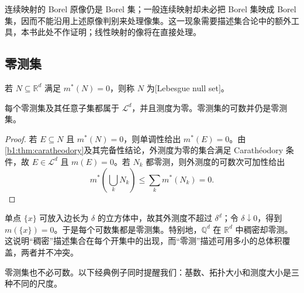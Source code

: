 连续映射的 Borel 原像仍是 Borel 集；一般连续映射却未必把 Borel 集映成 Borel 集，因而不能沿用上述原像判别来处理像集。这一现象需要描述集合论中的额外工具，本书此处不作证明；线性映射的像将在直接处理。

\subsection{零测集}
\label{b1:subsec:030203}

\begin{definition}
\label{b1:def:lebesgue-null}
若 \(N\subseteq\mathbb R^d\) 满足 \(m^*(N)=0\)，则称 \(N\) 为[Lebesgue null set]。
\end{definition}

\begin{proposition}
\label{b1:prop:null-subsets}
每个零测集及其任意子集都属于 \(\mathcal L^d\)，并且测度为零。零测集的可数并仍是零测集。
\end{proposition}
\begin{proof}
若 \(E\subseteq N\) 且 \(m^*(N)=0\)，则单调性给出 \(m^*(E)=0\)。由\cref{b1:thm:caratheodory}及其完备性结论，外测度为零的集合满足 Carathéodory 条件，故 \(E\in\mathcal L^d\) 且 \(m(E)=0\)。若 \(N_k\) 都零测，则外测度的可数次可加性给出
\[
m^*\left(\bigcup_kN_k\right)
\leq\sum_km^*(N_k)=0.
\]
\end{proof}

单点 \(\{x\}\) 可放入边长为 \(\delta\) 的立方体中，故其外测度不超过 \(\delta^d\)；令 \(\delta\downarrow0\)，得到 \(m(\{x\})=0\)。于是每个可数集都是零测集。特别地，\(\mathbb Q^d\) 在 \(\mathbb R^d\) 中稠密却零测。这说明“稠密”描述集合在每个开集中的出现，而“零测”描述可用多小的总体积覆盖，两者并不冲突。

\ProseParagraphBreak

零测集也不必可数。以下经典例子同时提醒我们：基数、拓扑大小和测度大小是三种不同的尺度。

